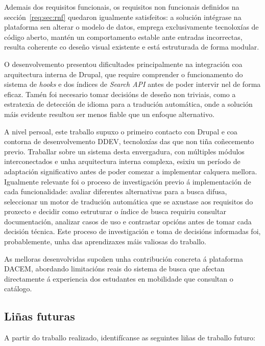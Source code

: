 \documentclass[%
    a4paper,               %
    twoside,               %
    10pt,                  %
]{article}                 %
\begin{document}
Ademais dos requisitos funcionais, os requisitos non funcionais definidos na sección~\ref{req:sec:rnf} quedaron igualmente satisfeitos: a solución intégrase na plataforma sen alterar o modelo de datos, emprega exclusivamente tecnoloxías de código aberto, mantén un comportamento estable ante entradas incorrectas, resulta coherente co deseño visual existente e está estruturada de forma modular.

O desenvolvemento presentou dificultades principalmente na integración coa arquitectura interna de Drupal, que require comprender o funcionamento do sistema de \textit{hooks} e dos índices de \textit{Search API} antes de poder intervir nel de forma eficaz. Tamén foi necesario tomar decisións de deseño non triviais, como a estratexia de detección de idioma para a tradución automática, onde a solución máis evidente resultou ser menos fiable que un enfoque alternativo.

A nivel persoal, este traballo supuxo o primeiro contacto con Drupal e coa contorna de desenvolvemento DDEV, tecnoloxías das que non tiña coñecemento previo. Traballar sobre un sistema desta envergadura, con múltiples módulos interconectados e unha arquitectura interna complexa, esixiu un período de adaptación significativo antes de poder comezar a implementar calquera mellora. Igualmente relevante foi o proceso de investigación previo á implementación de cada funcionalidade: avaliar diferentes alternativas para a busca difusa, seleccionar un motor de tradución automática que se axustase aos requisitos do proxecto e decidir como estruturar o índice de busca requiriu consultar documentación, analizar casos de uso e contrastar opcións antes de tomar cada decisión técnica. Este proceso de investigación e toma de decisións informadas foi, probablemente, unha das aprendizaxes máis valiosas do traballo.

As melloras desenvolvidas supoñen unha contribución concreta á plataforma DACEM, abordando limitacións reais do sistema de busca que afectan directamente á experiencia dos estudantes en mobilidade que consultan o catálogo.

\subsection{Liñas futuras}

A partir do traballo realizado, identifícanse as seguintes liñas de traballo futuro:
\end{document}
